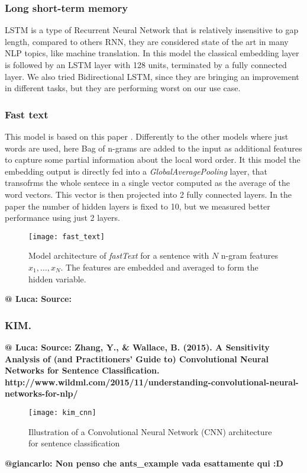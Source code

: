 \subsubsection{Long short-term memory}
LSTM is a type of Recurrent Neural Network that is relatively insensitive to gap length, compared to others RNN, they are considered state of the art in many NLP topics, like machine translation.
In this model the classical embedding layer is followed by an LSTM layer with 128 units, terminated by a fully connected layer.
We also tried Bidirectional LSTM, since they are bringing an improvement in different tasks, but they are performing worst on our use case.

\subsubsection{Fast text}
This model is based on this paper \cite{joulin2016bag}.
Differently to the other models where just words are used, here Bag of n-grams are added to the input as  additional features to capture some partial information about the local word order.
It this model the embedding output is directly fed into a \emph{GlobalAveragePooling} layer, that transofrms the whole sentece in a single vector computed as the average of the word vectors.
This vector is then projected into 2 fully connected layers. In the paper the number of hidden layers is fixed to 10, but we measured better performance using just 2 layers.
\begin{figure}[h]
\centering
\texttt{[image: fast\_text]}
\caption{\cite{joulin2016bag} Model architecture of \emph{fastText} for a sentence with $N$ n-gram features $x_1,\dots,x_N$. The features are embedded and averaged to form the hidden variable.}
\label{fig:fastText}
\end{figure}
\textbf{@ Luca: Source:  }


\subsubsection{KIM.}

\textbf{@ Luca: Source: Zhang, Y., \& Wallace, B. (2015). A Sensitivity Analysis of (and Practitioners’ Guide to) Convolutional Neural Networks for Sentence Classification.}
\textbf{http://www.wildml.com/2015/11/understanding-convolutional-neural-networks-for-nlp/}

\begin{figure}[h]
\centering
\texttt{[image: kim\_cnn]}
\caption{Illustration of a Convolutional Neural Network (CNN) architecture for sentence classification}
\label{fig:kim}
\end{figure}
\textbf{@giancarlo: Non penso che ants\_example vada esattamente qui :D}



